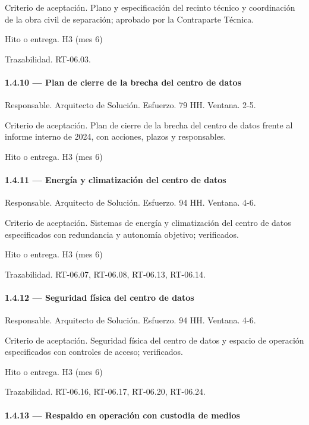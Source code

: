\documentclass[11pt]{article}
\begin{document}
Criterio de aceptación. Plano y especificación del recinto técnico y coordinación de la obra civil de separación; aprobado por la Contraparte Técnica.

Hito o entrega. H3 (mes 6)

Trazabilidad. RT-06.03.

\paragraph{1.4.10 — Plan de cierre de la brecha del centro de datos}

Responsable. Arquitecto de Solución. Esfuerzo. 79 HH. Ventana. 2-5.

Criterio de aceptación. Plan de cierre de la brecha del centro de datos frente al informe interno de 2024, con acciones, plazos y responsables.

Hito o entrega. H3 (mes 6)

\paragraph{1.4.11 — Energía y climatización del centro de datos}

Responsable. Arquitecto de Solución. Esfuerzo. 94 HH. Ventana. 4-6.

Criterio de aceptación. Sistemas de energía y climatización del centro de datos especificados con redundancia y autonomía objetivo; verificados.

Hito o entrega. H3 (mes 6)

Trazabilidad. RT-06.07, RT-06.08, RT-06.13, RT-06.14.

\paragraph{1.4.12 — Seguridad física del centro de datos}

Responsable. Arquitecto de Solución. Esfuerzo. 94 HH. Ventana. 4-6.

Criterio de aceptación. Seguridad física del centro de datos y espacio de operación especificados con controles de acceso; verificados.

Hito o entrega. H3 (mes 6)

Trazabilidad. RT-06.16, RT-06.17, RT-06.20, RT-06.24.

\paragraph{1.4.13 — Respaldo en operación con custodia de medios}
\end{document}
